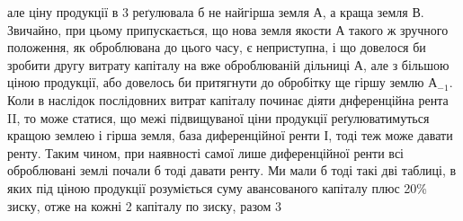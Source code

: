 \parcont{}  %
але ціну продукції в 3 реґулювала б не найгірша земля $А$, а краща
земля $В$. Звичайно, при цьому припускається, що нова земля якости $А$ такого
ж зручного положення, як оброблювана до цього часу, є неприступна, і що довелося
би зробити другу витрату капіталу на вже оброблюваній дільниці $А$, але
з більшою ціною продукції, або довелось би притягнути до обробітку ще гіршу
землю $А_{-1}$. Коли в наслідок послідовних витрат капіталу починає діяти днференційна
рента II, то може статися, що межі підвищуваної ціни продукції реґулюватимуться
кращою землею і гірша земля, база диференційної ренти І, тоді
теж може давати ренту. Таким чином, при наявності самої лише диференційної
ренти всі оброблювані землі почали б тоді давати ренту. Ми мали б тоді такі
дві таблиці, в яких під ціною продукції розуміється суму авансованого капіталу
плюс 20\%  зиску, отже на кожні 2 капіталу по 
зиску, разом 3

